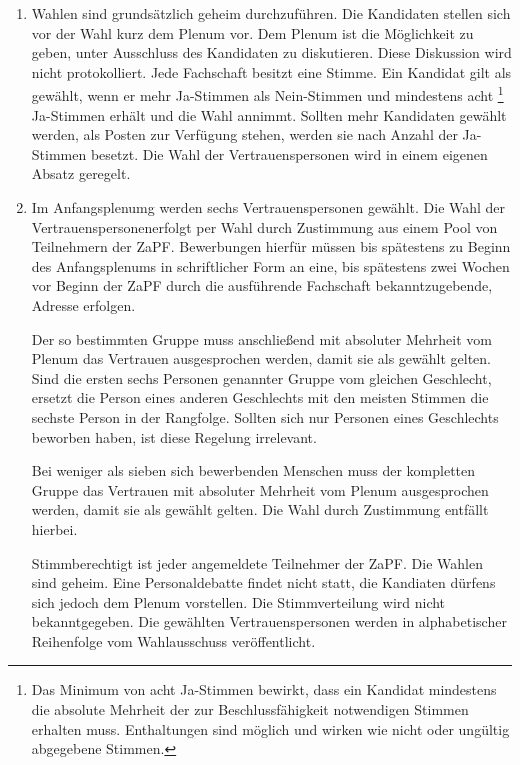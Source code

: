 \begin{enumerate}
  \item Wahlen sind grundsätzlich geheim durchzuführen. Die Kandidaten stellen sich vor der Wahl kurz
        dem Plenum vor. Dem Plenum ist die Möglichkeit zu geben, unter Ausschluss des Kandidaten zu
        diskutieren. Diese Diskussion wird nicht protokolliert. Jede Fachschaft besitzt eine Stimme. Ein Kandidat gilt als gewählt,
        wenn er mehr Ja-Stimmen als Nein-Stimmen und mindestens acht \footnote{Das Minimum von acht Ja-Stimmen bewirkt, dass ein Kandidat mindestens
        die absolute Mehrheit der zur Beschlussfähigkeit notwendigen Stimmen erhalten
        muss. Enthaltungen sind möglich und wirken wie nicht oder ungültig abgegebene Stimmen.} Ja-Stimmen erhält und die Wahl
        annimmt. Sollten mehr Kandidaten gewählt werden, als Posten zur
        Verfügung stehen, werden sie nach Anzahl der Ja-Stimmen besetzt.
        Die Wahl der Vertrauenspersonen wird in einem eigenen Absatz geregelt.

  \item Im Anfangsplenumg werden sechs Vertrauenspersonen gewählt.
        Die Wahl der Vertrauenspersonen\footnotemark erfolgt per Wahl durch Zustimmung aus
        einem Pool von Teilnehmern der ZaPF. Bewerbungen hierfür müssen bis spätestens zu Beginn
        des Anfangsplenums in schriftlicher Form an eine, bis spätestens zwei Wochen vor
        Beginn der ZaPF durch die ausführende Fachschaft bekanntzugebende, Adresse erfolgen.

        Der so bestimmten Gruppe muss anschließend mit absoluter Mehrheit vom Plenum
        das Vertrauen ausgesprochen werden, damit sie als gewählt gelten.
        Sind die ersten sechs Personen genannter Gruppe vom gleichen Geschlecht,
        ersetzt die Person eines anderen Geschlechts mit den meisten Stimmen die
        sechste Person in der Rangfolge.
        Sollten sich nur Personen eines Geschlechts beworben haben, ist diese Regelung irrelevant.

        Bei weniger als sieben sich bewerbenden Menschen muss der kompletten Gruppe
        das Vertrauen mit absoluter Mehrheit vom Plenum ausgesprochen werden,
        damit sie als gewählt gelten. Die Wahl durch Zustimmung entfällt hierbei.

        Stimmberechtigt ist jeder angemeldete Teilnehmer der ZaPF.
        Die Wahlen sind geheim. Eine Personaldebatte findet nicht statt,
        die Kandiaten dürfens sich jedoch dem Plenum vorstellen.
        Die Stimmverteilung wird nicht bekanntgegeben. Die gewählten Vertrauenspersonen
        werden in alphabetischer Reihenfolge vom Wahlausschuss veröffentlicht.


\end{enumerate}

